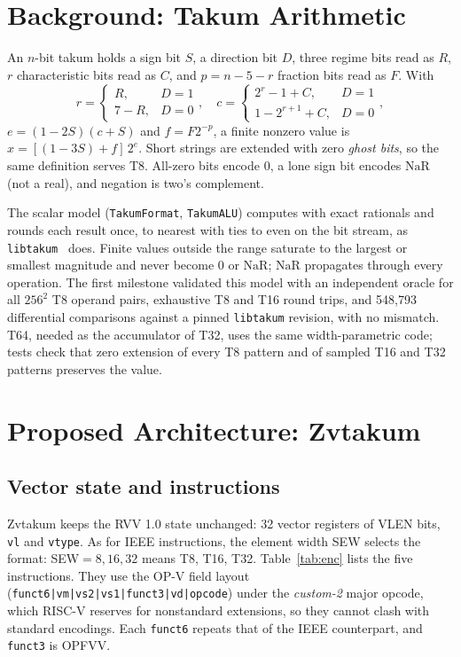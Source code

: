 \documentclass[conference]{IEEEtran}
\newcommand{\NaR}{\mathrm{NaR}}
\newcommand{\code}[1]{\texttt{#1}}
\begin{document}
\section{Background: Takum Arithmetic}
An $n$-bit takum holds a sign bit $S$, a direction bit $D$, three regime bits
read as $R$, $r$ characteristic bits read as $C$, and $p=n-5-r$ fraction bits
read as $F$. With
\begin{equation}
 r=\begin{cases}R,&D=1\\7-R,&D=0\end{cases},\quad
 c=\begin{cases}2^r-1+C,&D=1\\1-2^{r+1}+C,&D=0\end{cases},
\end{equation}
$e=(1-2S)(c+S)$ and $f=F2^{-p}$, a finite nonzero value is
$x=[(1-3S)+f]\,2^e$. Short strings are extended with zero \emph{ghost bits}, so
the same definition serves T8. All-zero bits encode $0$, a lone sign bit encodes
$\NaR$ (not a real), and negation is two's complement.

The scalar model (\code{TakumFormat}, \code{TakumALU}) computes with exact
rationals and rounds each result once, to nearest with ties to even on the bit
stream, as \code{libtakum}~\cite{libtakum} does. Finite values outside the range
saturate to the largest or smallest magnitude and never become $0$ or $\NaR$;
$\NaR$ propagates through every operation. The first milestone validated this
model with an independent oracle for all $256^2$ T8 operand pairs, exhaustive T8
and T16 round trips, and 548,793 differential comparisons against a pinned
\code{libtakum} revision, with no mismatch. T64, needed as the accumulator of
T32, uses the same width-parametric code; tests check that zero extension of
every T8 pattern and of sampled T16 and T32 patterns preserves the value.

\section{Proposed Architecture: Zvtakum}
\subsection{Vector state and instructions}
Zvtakum keeps the RVV 1.0 state unchanged: 32 vector registers of VLEN bits,
\code{vl} and \code{vtype}. As for IEEE instructions, the element width SEW
selects the format: SEW${}=8,16,32$ means T8, T16, T32. Table~\ref{tab:enc}
lists the five instructions. They use the OP-V field layout
(\code{funct6|vm|vs2|vs1|funct3|vd|opcode}) under the \emph{custom-2} major
opcode, which RISC-V reserves for nonstandard extensions, so they cannot clash
with standard encodings. Each \code{funct6} repeats that of the IEEE
counterpart, and \code{funct3} is OPFVV.
\end{document}

